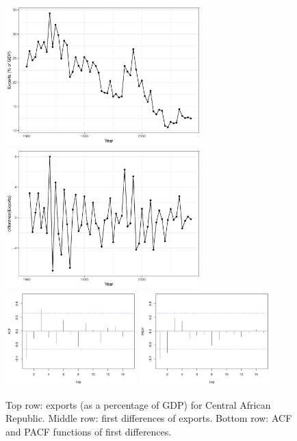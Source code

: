 \documentclass{article}
\begin{document}
\begin{itemize}
\begin{figure}[p]
\centering
\includegraphics[width=0.675\textwidth]{fig/car-1.pdf}
\includegraphics[width=0.675\textwidth]{fig/car-2.pdf}
\includegraphics[width=0.45\textwidth]{fig/car-3.pdf}
\includegraphics[width=0.45\textwidth]{fig/car-4.pdf}
\caption{Top row: exports (as a percentage of GDP) for Central African
  Republic. Middle row: first differences of exports. Bottom row: ACF and PACF
  functions of first differences.}
\label{fig:car-exploratory}
\end{figure}


\end{itemize}
\end{document}

